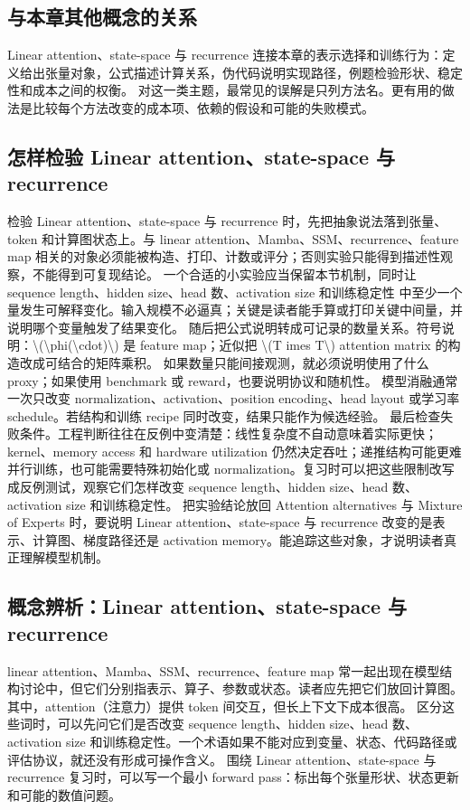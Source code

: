 \documentclass[a4paper]{article}
\begin{document}
\subsection{与本章其他概念的关系}
Linear attention、state-space 与 recurrence 连接本章的表示选择和训练行为：定义给出张量对象，公式描述计算关系，伪代码说明实现路径，例题检验形状、稳定性和成本之间的权衡。
对这一类主题，最常见的误解是只列方法名。更有用的做法是比较每个方法改变的成本项、依赖的假设和可能的失败模式。
\subsection{怎样检验 Linear attention、state-space 与 recurrence}
检验 Linear attention、state-space 与 recurrence 时，先把抽象说法落到张量、token 和计算图状态上。与 linear attention、Mamba、SSM、recurrence、feature map 相关的对象必须能被构造、打印、计数或评分；否则实验只能得到描述性观察，不能得到可复现结论。
一个合适的小实验应当保留本节机制，同时让 sequence length、hidden size、head 数、activation size 和训练稳定性 中至少一个量发生可解释变化。输入规模不必逼真；关键是读者能手算或打印关键中间量，并说明哪个变量触发了结果变化。
随后把公式说明转成可记录的数量关系。符号说明：\textbackslash{}(\textbackslash{}phi(\textbackslash{}cdot)\textbackslash{}) 是 feature map；近似把 \textbackslash{}(T imes T\textbackslash{}) attention matrix 的构造改成可结合的矩阵乘积。 如果数量只能间接观测，就必须说明使用了什么 proxy；如果使用 benchmark 或 reward，也要说明协议和随机性。
模型消融通常一次只改变 normalization、activation、position encoding、head layout 或学习率 schedule。若结构和训练 recipe 同时改变，结果只能作为候选经验。
最后检查失败条件。工程判断往往在反例中变清楚：线性复杂度不自动意味着实际更快；kernel、memory access 和 hardware utilization 仍然决定吞吐；递推结构可能更难并行训练，也可能需要特殊初始化或 normalization。复习时可以把这些限制改写成反例测试，观察它们怎样改变 sequence length、hidden size、head 数、activation size 和训练稳定性。
把实验结论放回 Attention alternatives 与 Mixture of Experts 时，要说明 Linear attention、state-space 与 recurrence 改变的是表示、计算图、梯度路径还是 activation memory。能追踪这些对象，才说明读者真正理解模型机制。
\subsection{概念辨析：Linear attention、state-space 与 recurrence}
linear attention、Mamba、SSM、recurrence、feature map 常一起出现在模型结构讨论中，但它们分别指表示、算子、参数或状态。读者应先把它们放回计算图。
其中，attention（注意力）提供 token 间交互，但长上下文下成本很高。
区分这些词时，可以先问它们是否改变 sequence length、hidden size、head 数、activation size 和训练稳定性。一个术语如果不能对应到变量、状态、代码路径或评估协议，就还没有形成可操作含义。
围绕 Linear attention、state-space 与 recurrence 复习时，可以写一个最小 forward pass：标出每个张量形状、状态更新和可能的数值问题。
\end{document}
